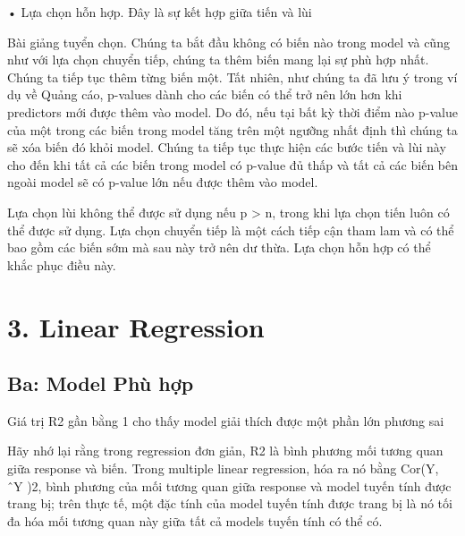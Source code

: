 • Lựa chọn hỗn hợp. Đây là sự kết hợp giữa tiến và lùi

Bài giảng tuyển chọn. Chúng ta bắt đầu không có biến nào trong model và cũng như với lựa chọn chuyển tiếp, chúng ta thêm biến mang lại sự phù hợp nhất. Chúng ta tiếp tục thêm từng biến một. Tất nhiên, như chúng ta đã lưu ý trong ví dụ về Quảng cáo, p-values dành cho các biến có thể trở nên lớn hơn khi predictors mới được thêm vào model. Do đó, nếu tại bất kỳ thời điểm nào p-value của một trong các biến trong model tăng trên một ngưỡng nhất định thì chúng ta sẽ xóa biến đó khỏi model. Chúng ta tiếp tục thực hiện các bước tiến và lùi này cho đến khi tất cả các biến trong model có p-value đủ thấp và tất cả các biến bên ngoài model sẽ có p-value lớn nếu được thêm vào model.

Lựa chọn lùi không thể được sử dụng nếu p > n, trong khi lựa chọn tiến luôn có thể được sử dụng. Lựa chọn chuyển tiếp là một cách tiếp cận tham lam và có thể bao gồm các biến sớm mà sau này trở nên dư thừa. Lựa chọn hỗn hợp có thể khắc phục điều này.

\section{3. Linear Regression}

\subsection{Ba: Model Phù hợp}

Giá trị R2 gần bằng 1 cho thấy model giải thích được một phần lớn phương sai

Hãy nhớ lại rằng trong regression đơn giản, R2 là bình phương mối tương quan giữa response và biến. Trong multiple linear regression, hóa ra nó bằng Cor(Y, ˆY )2, bình phương của mối tương quan giữa response và model tuyến tính được trang bị; trên thực tế, một đặc tính của model tuyến tính được trang bị là nó tối đa hóa mối tương quan này giữa tất cả models tuyến tính có thể có.

